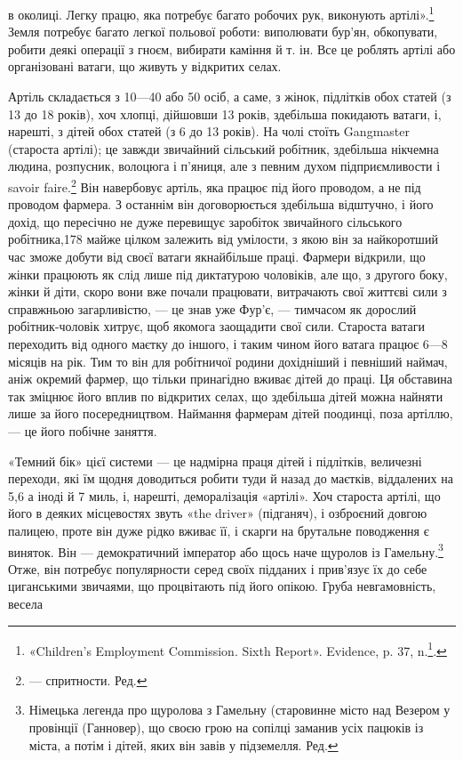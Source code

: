 в околиці. Легку працю, яка потребує багато робочих рук, виконують
артілі».\footnote{
«Children's Employment Commission. Sixth Report». Evidence,
p. 37, n.\footnote{
Однак деякі старости артілі доробляються до того, що стають
фармерами, які мають 500 акрів землі, або власниками цілого ряду будинків.
}.
} Земля потребує багато легкої польової роботи:
виполювати бур’ян, обкопувати, робити деякі операції з
гноєм, вибирати каміння й т. ін. Все це роблять артілі або організовані
ватаги, що живуть у відкритих селах.

Артіль складається з 10—40 або 50 осіб, а саме, з жінок,
підлітків обох статей (з 13 до 18 років), хоч хлопці, дійшовши
13 років, здебільша покидають ватаги, і, нарешті, з дітей обох
статей (з 6 до 13 років). На чолі стоїть Gangmaster (староста
артілі); це завжди звичайний сільський робітник, здебільша
нікчемна людина, розпусник, волоцюга і п’яниця, але з певним
духом підприємливости і savoir faire.\footnote*{
— спритности. Ред.
} Він навербовує артіль,
яка працює під його проводом, а не під проводом фармера. З останнім
він договорюється здебільша відштучно, і його дохід, що
пересічно не дуже перевищує заробіток звичайного сільського
робітника,178 майже цілком залежить від умілости, з якою він
за найкоротший час зможе добути від своєї ватаги якнайбільше
праці. Фармери відкрили, що жінки працюють як слід лише під
диктатурою чоловіків, але що, з другого боку, жінки й діти,
скоро вони вже почали працювати, витрачають свої життєві
сили з справжньою загарливістю, — це знав уже Фур’є, — тимчасом
як дорослий робітник-чоловік хитрує, щоб якомога заощадити
свої сили. Староста ватаги переходить від одного маєтку
до іншого, і таким чином його ватага працює 6—8 місяців на
рік. Тим то він для робітничої родини дохідніший і певніший
наймач, аніж окремий фармер, що тільки принагідно вживає
дітей до праці. Ця обставина так зміцнює його вплив по відкритих
селах, що здебільша дітей можна найняти лише за його посередництвом.
Наймання фармерам дітей поодинці, поза артіллю, —
це його побічне заняття.

«Темний бік» цієї системи — це надмірна праця дітей і підлітків,
величезні переходи, які їм щодня доводиться робити туди
й назад до маєтків, віддалених на 5,6 а іноді й 7 миль, і, нарешті,
деморалізація «артілі». Хоч староста артілі, що його в деяких
місцевостях звуть «the driver» (підганяч), і озброєний довгою
палицею, проте він дуже рідко вживає її, і скарги на брутальне
поводження є виняток. Він — демократичний імператор або щось
наче щуролов із Гамельну.\footnote*{
Німецька легенда про щуролова з Гамельну (старовинне місто
над Везером у провінції (Ганновер), що своєю грою на сопілці заманив
усіх пацюків із міста, а потім і дітей, яких він завів у підземелля. Ред.
} Отже, він потребує популярности
серед своїх підданих і прив’язує їх до себе циганськими звичаями,
що процвітають під його опікою. Груба невгамовність, весела